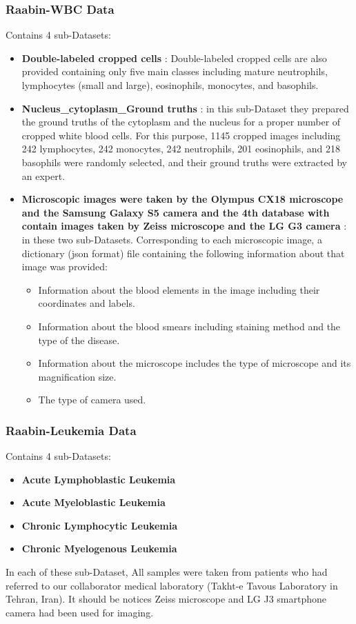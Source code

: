 {\subsubsection{Raabin-WBC Data}
\hspace{\parindent}
Contains 4 sub-Datasets:
\begin{itemize}
    \item \textbf{Double-labeled cropped cells} : Double-labeled cropped cells are also provided containing only five main classes including mature neutrophils, lymphocytes (small and large), eosinophils, monocytes, and basophils. 
    \item \textbf{Nucleus\_cytoplasm\_Ground truths} : in this sub-Dataset they prepared the ground truths of the cytoplasm and the nucleus for a proper number of cropped white blood cells. For this purpose, 1145 cropped images including 242 lymphocytes, 242 monocytes, 242 neutrophils, 201 eosinophils, and 218 basophils were randomly selected, and their ground truths were extracted by an expert.
    \item \textbf{Microscopic images were taken by the Olympus CX18 microscope and the Samsung Galaxy S5 camera and the 4th database with contain images taken by Zeiss microscope and the LG G3 camera } : in these two sub-Datasets. Corresponding to each microscopic image, a dictionary (json format) file containing the following information about that image was provided:
    \begin{itemize}
        \item Information about the blood elements in the image including their coordinates and labels.
        \item Information about the blood smears including staining method and the type of the disease.
        \item Information about the microscope includes the type of microscope and its magnification size.
        \item The type of camera used.
    \end{itemize}
\end{itemize}

\subsubsection{Raabin-Leukemia Data}
\hspace{\parindent}
Contains 4 sub-Datasets:
\begin{itemize}
    \item \textbf{Acute Lymphoblastic Leukemia}
    \item \textbf{Acute Myeloblastic Leukemia} 
    \item \textbf{Chronic Lymphocytic Leukemia}
    \item \textbf{Chronic Myelogenous Leukemia}
\end{itemize}
In each of these sub-Dataset, All samples were taken from patients who had referred to our collaborator medical laboratory (Takht-e Tavous Laboratory in Tehran, Iran). It should be notices Zeiss microscope and LG J3 smartphone camera had been used for imaging.

}
